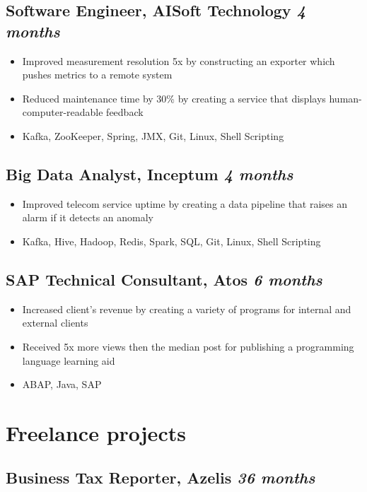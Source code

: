 \documentclass[a4paper]{article}
\newcommand{\bolditalicpair}
[2]
{\textbf{#1} \texorpdfstring{\hfill}{} \textit{#2}}
\begin{document}
\subsection{\bolditalicpair{Software Engineer, AISoft Technology}{4 months}}

\begin{itemize}
  \item Improved measurement resolution 5x by constructing an exporter which pushes metrics to a remote system
  \item Reduced maintenance time by 30\% by creating a service that displays human-computer-readable feedback
  \item Kafka, ZooKeeper, Spring, JMX, Git, Linux, Shell Scripting
\end{itemize}

\subsection{\bolditalicpair{Big Data Analyst, Inceptum}{4 months}}

\begin{itemize}
  \item Improved telecom service uptime by creating a data pipeline that raises an alarm if it detects an anomaly
  \item Kafka, Hive, Hadoop, Redis, Spark, SQL, Git, Linux, Shell Scripting
\end{itemize}

\subsection{\bolditalicpair{SAP Technical Consultant, Atos}{6 months}}

\begin{itemize}
  \item Increased client's revenue by creating a variety of programs for internal and external clients
  \item Received 5x more views then the median post for publishing a programming language learning aid
  \item ABAP, Java, SAP
\end{itemize}



\section{Freelance projects}
\subsection{\bolditalicpair{Business Tax Reporter, Azelis}{36 months}}
\end{document}
